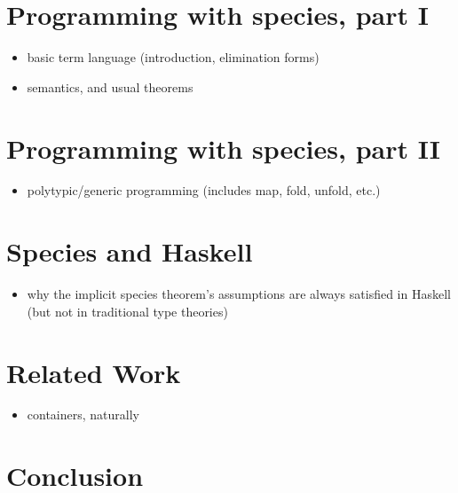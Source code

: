 \documentclass[9pt]{sigplanconf}
\begin{document}
\section{Programming with species, part I}\label{sec:prog1}
\begin{itemize}
\item basic term language (introduction, elimination forms)
\item semantics, and usual theorems
\end{itemize}

\section{Programming with species, part II}\label{sec:prog2}
\begin{itemize}
\item polytypic/generic programming (includes map, fold, unfold, etc.)
\end{itemize}

\section{Species and Haskell}\label{sec:haskell}
\begin{itemize}
\item why the implicit species theorem's assumptions are always satisfied in Haskell (but not in traditional type theories)
\end{itemize}

\section{Related Work}\label{sec:related}
\begin{itemize}
\item containers, naturally 
\end{itemize}

\section{Conclusion}\label{sec:conclusion}

%
%
\end{document}
